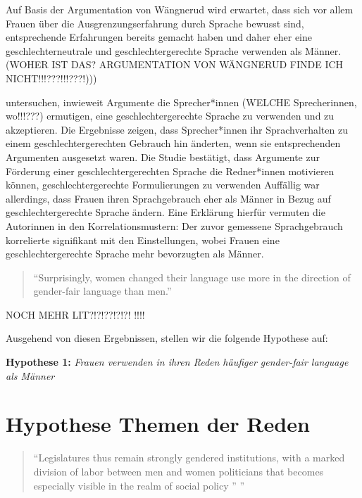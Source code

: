 \documentclass[12pt, 
    twoside=false, 
    bibliography=totoc, 
    numbers=endperiod, 
    headings=normal, 
    toc=chapterentrydotfill
    ]{scrbook}
\begin{document}
Auf Basis der Argumentation von Wängnerud \parencites*{wangnerud_2000}{wangnerud_2009} wird erwartet, dass sich vor allem Frauen über die Ausgrenzungserfahrung durch Sprache bewusst sind, entsprechende Erfahrungen bereits gemacht haben und daher eher eine geschlechterneutrale und geschlechtergerechte Sprache verwenden als Männer.  (WOHER IST DAS? ARGUMENTATION VON WÄNGNERUD FINDE ICH NICHT!!!???!!!???!))) 

\textcite{koeser_2014} untersuchen, inwieweit Argumente die Sprecher*innen (WELCHE Sprecherinnen, wo!!!???) ermutigen, eine geschlechtergerechte Sprache zu verwenden und zu akzeptieren. Die Ergebnisse zeigen, dass Sprecher*innen ihr Sprachverhalten zu einem geschlechtergerechten Gebrauch hin änderten, wenn sie entsprechenden Argumenten ausgesetzt waren. Die Studie bestätigt, dass Argumente zur Förderung einer geschlechtergerechten Sprache die Redner*innen motivieren können, geschlechtergerechte Formulierungen zu verwenden \parencite[548]{koeser_2014} Auffällig war allerdings, dass Frauen ihren Sprachgebrauch eher als Männer in Bezug auf geschlechtergerechte Sprache ändern. Eine Erklärung hierfür vermuten die Autorinnen in den Korrelationsmustern: Der zuvor gemessene Sprachgebrauch korrelierte signifikant mit den Einstellungen, wobei Frauen eine geschlechtergerechte Sprache mehr bevorzugten als Männer\parencite[555]{koeser_2014}.

\begin{quote}
    \enquote {Surprisingly, women changed their language use more in the direction of gender-fair language than men.} \parencite[555]{koeser_2014}
\end{quote}


NOCH MEHR LIT?!?!??!?!?! !!!!

Ausgehend von diesen Ergebnissen, stellen wir die folgende Hypothese auf: 


\textbf{Hypothese 1:} \emph{Frauen verwenden in ihren Reden häufiger gender-fair language als Männer}



\section{Hypothese Themen der Reden}

\begin{quote}
    \enquote{Legislatures thus remain strongly gendered institutions, with a marked division of labor between men and women politicians that becomes especially visible in the realm of social policy ” \parencite[250]{ennser-jedenastik_2017}}
\end{quote}
\end{document}
